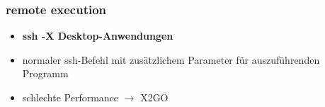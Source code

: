\begin{frame}
\frametitle{remote execution}
\begin{itemize}
\item \textbf{ssh -X Desktop-Anwendungen}
\pause
\item normaler ssh-Befehl mit zusätzlichem Parameter für auszuführenden Programm
\pause
\item schlechte Performance $\rightarrow$ X2GO
\end{itemize}
\end{frame}